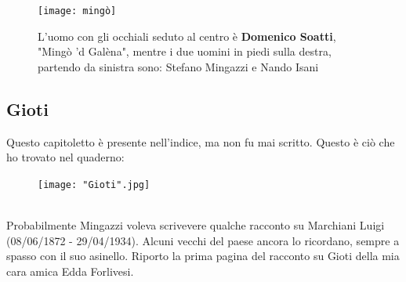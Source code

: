  \begin{figure}[htb]
    \centering
    \texttt{[image: mingò]}
    \caption[Gruppo Montecatini di Alfonsine]{L'uomo con gli occhiali seduto al centro è \textbf{Domenico Soatti}, "Mingò 'd Galèna", mentre i due uomini in piedi sulla destra, partendo da sinistra sono: Stefano Mingazzi e Nando Isani\label{fig:mingò}}
\end{figure}

\newpage
\subsection{Gioti}
Questo capitoletto è presente nell'indice, ma non fu mai scritto. Questo è ciò che ho trovato nel quaderno:\\
\begin{figure}[!htbp]
   \texttt{[image: "Gioti".jpg]}
\end{figure}
\\Probabilmente Mingazzi voleva scrivevere qualche racconto su Marchiani Luigi (08/06/1872 - 29/04/1934). Alcuni vecchi del paese ancora lo ricordano, sempre a spasso con il suo asinello.
\newpage
Riporto la prima pagina del racconto su Gioti della mia cara amica Edda Forlivesi.\\

